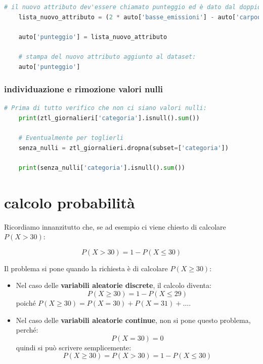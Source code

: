 \documentclass{article}
\begin{document}
\begin{lstlisting}[language=Python]
    # il nuovo attributo dev'essere chiamato punteggio ed è dato dal doppio delle basse emissioni - carpooling:
    lista_nuovo_attributo = (2 * auto['basse_emissioni'] - auto['carpooling'].to_numpy())

    auto['punteggio'] = lista_nuovo_attributo

    # stampa del nuovo attributo aggiunto al dataset:
    auto['punteggio']
\end{lstlisting}

\subsubsection*{individuazione e rimozione valori nulli}

\begin{lstlisting}[language=python]
    # Prima di tutto verifico che non ci siano valori nulli:
    print(ztl_giornalieri['categoria'].isnull().sum())

    # Eventualmente per toglierli
    senza_nulli = ztl_giornalieri.dropna(subset=['categoria'])

    print(senza_nulli['categoria'].isnull().sum())
\end{lstlisting}



\pagebreak

\section{calcolo probabilità}

Ricordiamo innanzitutto che, se ad esempio ci viene chiesto di calcolare $P(X > 30)$:

\[
P(X > 30) = 1 - P(X \leq 30)
\]

Il problema si pone quando la richiesta è di calcolare $P(X \geq 30)$:

\begin{itemize}
  \item Nel caso delle \textbf{variabili aleatorie discrete}, il calcolo diventa:
  \[
  P(X \geq 30) = 1 - P(X \leq 29)
  \]
  poiché $P(X \geq 30) = P(X = 30) + P(X = 31) + \dots$.

  \item Nel caso delle \textbf{variabili aleatorie continue}, non si pone questo problema, perché:
  \[
  P(X = 30) = 0
  \]
  quindi si può scrivere semplicemente:
  \[
  P(X \geq 30) = P(X > 30) = 1 - P(X \leq 30)
  \]
\end{itemize}
\end{document}
